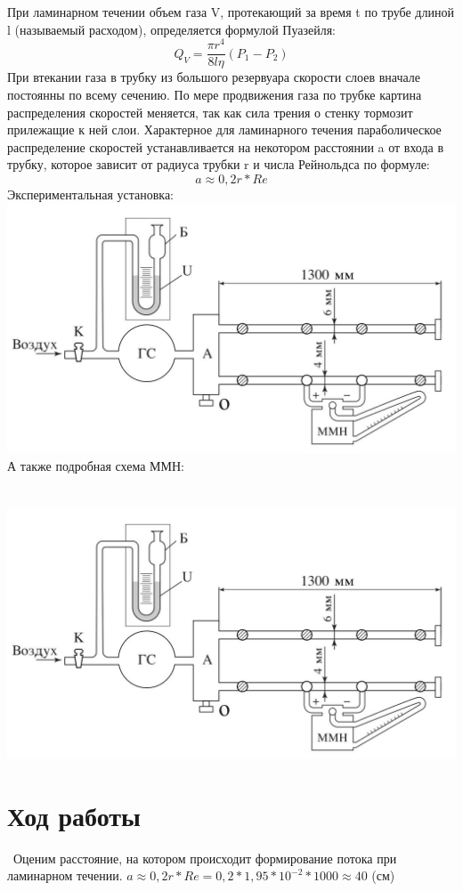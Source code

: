 \documentclass[11pt]{article}
\begin{document}
При ламинарном течении объем газа V, протекающий за время t по трубе длиной l (называемый расходом), определяется формулой Пуазейля: $$Q_V=\frac{\pi r^4}{8l\eta}(P_1-P_2)$$
При	втекании	газа	в	
трубку	из большого резервуара скорости слоев вначале постоянны по всему сечению.
\indent По мере продвижения  газа по	трубке	
картина распределения скоростей меняется, так как сила трения о стенку тормозит прилежащие к ней слои. Характерное для ламинарного	
течения параболическое распределение скоростей устанавливается на	
некотором расстоянии a от входа в трубку, которое зависит от радиуса трубки r и числа Рейнольдса по формуле: $$a\approx0,2r*Re$$
\newpage
Экспериментальная установка:
\\
\includegraphics[scale=0.6]{asd.png} \\
А также подробная схема ММН:
\\
\ \\ \
\includegraphics[scale=0.4]{asd.png}


\section*{Ход работы}\
\indent Оценим расстояние, на котором происходит формирование потока при ламинарном течении.
$a\approx0,2r*Re=0,2*1,95*10^{-2}*1000\approx 40$ (см)
\end{document}
